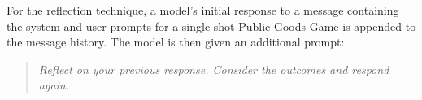 {

For the reflection technique, a model’s initial response to a message containing the system and user prompts for a single-shot Public Goods Game is appended to the message history.  
The model is then given an additional prompt:
\begin{quote}
\textit{Reflect on your previous response. Consider the outcomes and respond again.}
\end{quote}




}
